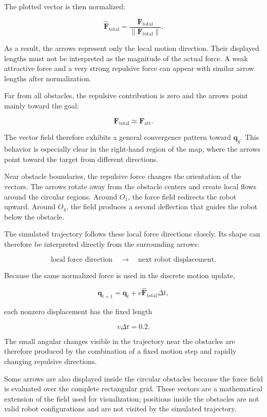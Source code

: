 \documentclass[10pt,twocolumn,a4paper]{article}
\begin{document}
The plotted vector is then normalized:

\[
    \hat{\mathbf{F}}_{\mathrm{total}}
    =
    \frac{
        \mathbf{F}_{\mathrm{total}}
    }{
        \left\|
            \mathbf{F}_{\mathrm{total}}
        \right\|
    }.
\]

As a result, the arrows represent only the local motion direction. Their
displayed lengths must not be interpreted as the magnitude of the actual
force. A weak attractive force and a very strong repulsive force can appear
with similar arrow lengths after normalization.

Far from all obstacles, the repulsive contribution is zero and the arrows
point mainly toward the goal:

\[
    \mathbf{F}_{\mathrm{total}}
    \approx
    \mathbf{F}_{\mathrm{att}}.
\]

The vector field therefore exhibits a general convergence pattern toward
$\mathbf{q}_g$. This behavior is especially clear in the right-hand region
of the map, where the arrows point toward the target from different
directions.

Near obstacle boundaries, the repulsive force changes the orientation of
the vectors. The arrows rotate away from the obstacle centers and create
local flows around the circular regions. Around $O_1$, the force field
redirects the robot upward. Around $O_4$, the field produces a second
deflection that guides the robot below the obstacle.

The simulated trajectory follows these local force directions closely. Its
shape can therefore be interpreted directly from the surrounding arrows:

\[
    \text{local force direction}
    \quad\longrightarrow\quad
    \text{next robot displacement}.
\]

Because the same normalized force is used in the discrete motion update,

\[
    \mathbf{q}_{t+1}
    =
    \mathbf{q}_t
    +
    v
    \hat{\mathbf{F}}_{\mathrm{total}}
    \Delta t,
\]

each nonzero displacement has the fixed length

\[
    v\Delta t
    =
    0.2.
\]

The small angular changes visible in the trajectory near the obstacles are
therefore produced by the combination of a fixed motion step and rapidly
changing repulsive directions.

Some arrows are also displayed inside the circular obstacles because the
force field is evaluated over the complete rectangular grid. These vectors
are a mathematical extension of the field used for visualization; positions
inside the obstacles are not valid robot configurations and are not visited
by the simulated trajectory.
\end{document}
